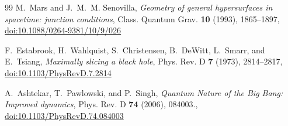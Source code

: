 \documentclass[11pt,reqno]{amsart}
\theoremstyle{definition}
\numberwithin{equation}{section}
\begin{document}
\begin{thebibliography}{99}
M.~Mars and J.~M.~M. Senovilla,
\emph{Geometry of general hypersurfaces in spacetime: junction conditions},
Class. Quantum Grav. \textbf{10} (1993), 1865--1897, \href{https://doi.org/10.1088/0264-9381/10/9/026}{doi:10.1088/0264-9381/10/9/026}

F.~Estabrook, H.~Wahlquist, S.~Christensen, B.~DeWitt, L.~Smarr, and E.~Tsiang,
\emph{Maximally slicing a black hole},
Phys. Rev. D \textbf{7} (1973), 2814--2817, \href{https://doi.org/10.1103/PhysRevD.7.2814}{doi:10.1103/PhysRevD.7.2814}

A.~Ashtekar, T.~Pawlowski, and P.~Singh,
\emph{Quantum Nature of the Big Bang: Improved dynamics},
Phys. Rev. D \textbf{74} (2006), 084003., \href{https://doi.org/10.1103/PhysRevD.74.084003}{doi:10.1103/PhysRevD.74.084003}

\end{thebibliography}
\endgroup
\end{document}
